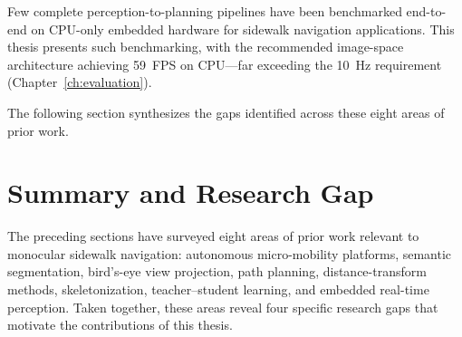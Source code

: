 \documentclass[12pt,letterpaper,oneside]{report}
\begin{document}
Few complete perception-to-planning pipelines have been benchmarked end-to-end on CPU-only embedded hardware for sidewalk navigation applications. This thesis presents such benchmarking, with the recommended image-space architecture achieving 59~FPS on CPU---far exceeding the 10~Hz requirement (Chapter~\ref{ch:evaluation}).

The following section synthesizes the gaps identified across these eight areas of prior work.


\section{Summary and Research Gap}

The preceding sections have surveyed eight areas of prior work relevant to monocular sidewalk navigation: autonomous micro-mobility platforms, semantic segmentation, bird's-eye view projection, path planning, distance-transform methods, skeletonization, teacher--student learning, and embedded real-time perception. Taken together, these areas reveal four specific research gaps that motivate the contributions of this thesis.
\end{document}
